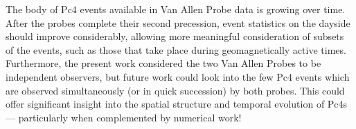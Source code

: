 \documentclass{article}
\begin{document}
The body of Pc4 events available in Van Allen Probe data is growing over time. After the probes complete their second precession, event statistics on the dayside should improve considerably, allowing more meaningful consideration of subsets of the events, such as those that take place during geomagnetically active times. Furthermore, the present work considered the two Van Allen Probes to be independent observers, but future work could look into the few Pc4 events which are observed simultaneously (or in quick succession) by both probes. This could offer significant insight into the spatial structure and temporal evolution of Pc4s --- particularly when complemented by numerical work!

























\end{document}
